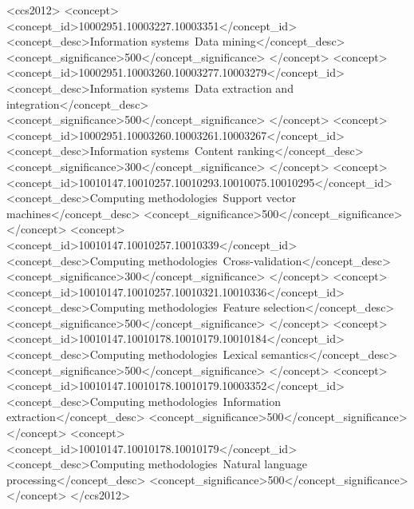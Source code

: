 \begin{CCSXML}
<ccs2012>
   <concept>
       <concept_id>10002951.10003227.10003351</concept_id>
       <concept_desc>Information systems~Data mining</concept_desc>
       <concept_significance>500</concept_significance>
       </concept>
   <concept>
       <concept_id>10002951.10003260.10003277.10003279</concept_id>
       <concept_desc>Information systems~Data extraction and integration</concept_desc>
       <concept_significance>500</concept_significance>
       </concept>
   <concept>
       <concept_id>10002951.10003260.10003261.10003267</concept_id>
       <concept_desc>Information systems~Content ranking</concept_desc>
       <concept_significance>300</concept_significance>
       </concept>
   <concept>
       <concept_id>10010147.10010257.10010293.10010075.10010295</concept_id>
       <concept_desc>Computing methodologies~Support vector machines</concept_desc>
       <concept_significance>500</concept_significance>
       </concept>
   <concept>
       <concept_id>10010147.10010257.10010339</concept_id>
       <concept_desc>Computing methodologies~Cross-validation</concept_desc>
       <concept_significance>300</concept_significance>
       </concept>
   <concept>
       <concept_id>10010147.10010257.10010321.10010336</concept_id>
       <concept_desc>Computing methodologies~Feature selection</concept_desc>
       <concept_significance>500</concept_significance>
       </concept>
   <concept>
       <concept_id>10010147.10010178.10010179.10010184</concept_id>
       <concept_desc>Computing methodologies~Lexical semantics</concept_desc>
       <concept_significance>500</concept_significance>
       </concept>
   <concept>
       <concept_id>10010147.10010178.10010179.10003352</concept_id>
       <concept_desc>Computing methodologies~Information extraction</concept_desc>
       <concept_significance>500</concept_significance>
       </concept>
   <concept>
       <concept_id>10010147.10010178.10010179</concept_id>
       <concept_desc>Computing methodologies~Natural language processing</concept_desc>
       <concept_significance>500</concept_significance>
       </concept>
 </ccs2012>
\end{CCSXML}


